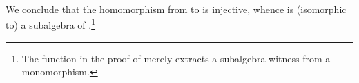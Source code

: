 \begin{code}
\AgdaSpace{}%
\AgdaSpace{}%
\AgdaSpace{}%
\<%
\\
%
\>[3]%
\>[9]\AgdaSymbol{=}\AgdaSpace{}%
\AgdaSpace{}%
\AgdaSymbol{(}\AgdaSymbol{\{}\AgdaSpace{}%
\AgdaSymbol{=}\AgdaSpace{}%
\AgdaSpace{}%
\AgdaSpace{}%
\AgdaSymbol{\}(}\AgdaSpace{}%
\AgdaSpace{}%
\AgdaSpace{}%
\AgdaSymbol{)}\AgdaSpace{}%
\AgdaSymbol{)}\<%
\\
%
\>[9]\AgdaSymbol{(}\AgdaSpace{}%
\AgdaSpace{}%
\AgdaSymbol{(}\AgdaSpace{}%
\AgdaSymbol{)(}\AgdaSpace{}%
\AgdaSymbol{(}\AgdaSymbol{\{}\AgdaSpace{}%
\AgdaSymbol{=}\AgdaSpace{}%
\AgdaSpace{}%
\AgdaSpace{}%
\AgdaSymbol{\}}\AgdaSpace{}%
\AgdaSymbol{(}\AgdaSpace{}%
\AgdaSpace{}%
\AgdaSpace{}%
\AgdaSymbol{)}\AgdaSpace{}%
\AgdaSymbol{)))}\<%
\\
\>[0]\<%
\end{code}
\fi
\noindent We conclude that the homomorphism from  to  is injective, whence
 is (isomorphic to) a subalgebra of .\footnote{The function  in
the proof of  merely extracts a subalgebra witness from a monomorphism.}

